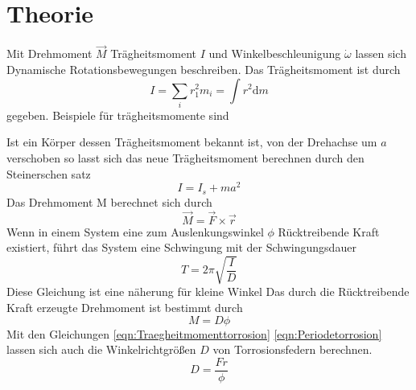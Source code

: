 

\section{Theorie}
\label{sec:Theorie}
Mit Drehmoment $\vec{M}$ Trägheitsmoment $I$ und Winkelbeschleunigung $\dot{\omega}$
lassen sich Dynamische Rotationsbewegungen beschreiben. Das Trägheitsmoment ist
durch
\begin{equation}
  I=\sum_i r_1^2m_i=\int r^2 \text{d}m
\end{equation}
gegeben.
Beispiele für trägheitsmomente sind
\begin{figure}
\end{figure}
Ist ein Körper dessen Trägheitsmoment bekannt ist, von der Drehachse um
$a$ verschoben so lasst sich das neue Trägheitsmoment berechnen durch den
Steinerschen satz
\begin{equation}
  I=I_s+m a^2
\end{equation}
Das Drehmoment M berechnet sich durch
\begin{equation}
  \vec{M}=\vec{F}\times\vec{r}
\end{equation}
Wenn in einem System eine zum Auslenkungswinkel $\phi$ Rücktreibende Kraft
existiert, führt das System eine Schwingung mit der Schwingungsdauer
\begin{equation}
  T=2\pi\sqrt{\frac{I}{D}}
  \label{eqn:Periodetorrosion}
\end{equation}
Diese Gleichung ist eine näherung für kleine Winkel
Das durch die Rücktreibende Kraft erzeugte Drehmoment ist bestimmt durch
\begin{equation}
  M=D \phi
  \label{eqn:Traegheitmomenttorrosion}
\end{equation}
Mit den Gleichungen \eqref{eqn:Traegheitmomenttorrosion} \eqref{eqn:Periodetorrosion}
lassen sich auch die Winkelrichtgrößen $D$ von Torrosionsfedern
berechnen.
\begin{equation}
  D=\frac{Fr}{\phi}
  \label{eqn:Winkelrichtgroesse}
\end{equation}
  \cite{sample}
